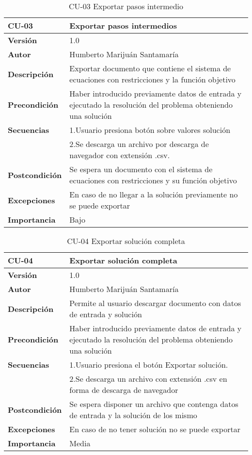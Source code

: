 \begin{table}[th!]
\begin{tabular}{  m{5cm}  m{7cm}  }
\hline \textbf{CU-03} & \textbf{Exportar pasos intermedios} \\ 
\hline
\textbf{Versión} & 1.0\\
\textbf{Autor} & Humberto Marijuán Santamaría\\
\textbf{Descripción} & Exportar documento que contiene el sistema de ecuaciones con restricciones y la función objetivo\\
\textbf{Precondición} & Haber introducido previamente datos de entrada y ejecutado la resolución del problema obteniendo una solución\\
\textbf{Secuencias} & 1.Usuario presiona botón sobre valores solución \\ 
                    & 2.Se descarga un archivo por descarga de navegador con extensión .csv.\\
\textbf{Postcondición} & Se espera un documento con el sistema de ecuaciones con restricciones y su función objetivo\\
\textbf{Excepciones} & En caso de no llegar a la solución previamente no se puede exportar\\
\textbf{Importancia} & Bajo\\
\hline
\end{tabular}
\caption{CU-03 Exportar pasos intermedio}
\label{ref:tablacu_03}
\end{table}

\begin{table}[th!]
\begin{tabular}{  m{5cm}  m{7cm}  }
\hline \textbf{CU-04} & \textbf{Exportar solución completa} \\ 
\hline
\textbf{Versión} & 1.0\\
\textbf{Autor} & Humberto Marijuán Santamaría\\
\textbf{Descripción} & Permite al usuario descargar documento con datos de entrada y solución\\
\textbf{Precondición} & Haber introducido previamente datos de entrada y ejecutado la resolución del problema obteniendo una solución\\
\textbf{Secuencias} & 1.Usuario presiona el botón Exportar solución.\\ 
                    & 2.Se descarga un archivo con extensión .csv en forma de descarga de navegador \\
\textbf{Postcondición} & Se espera disponer un archivo que contenga datos de entrada y la solución de los mismo \\
\textbf{Excepciones} & En caso de no tener solución no se puede exportar\\
\textbf{Importancia} & Media\\
\hline
\end{tabular}
\caption{CU-04 Exportar solución completa}
\label{ref:tablacu_04}
\end{table}

